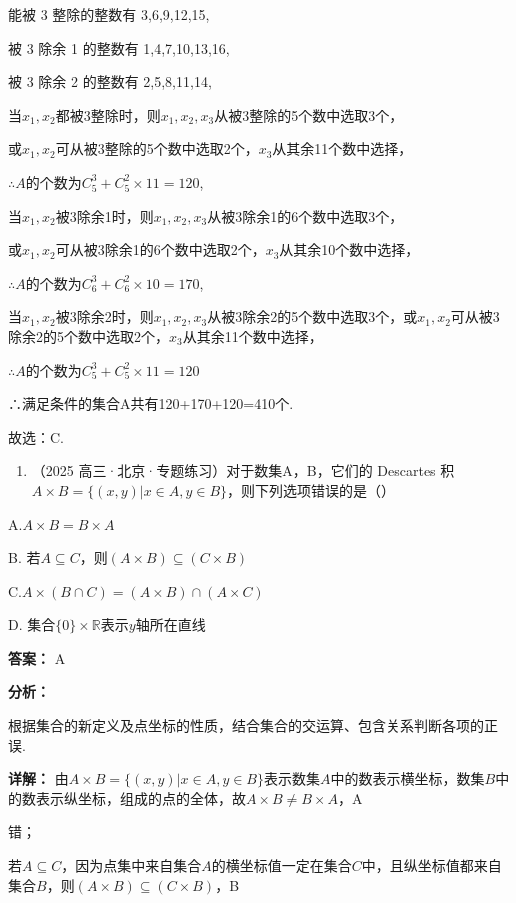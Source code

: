 \documentclass[11pt,a4paper]{ctexart}
\begin{document}
能被 3 整除的整数有 3,6,9,12,15,

被 3 除余 1 的整数有 1,4,7,10,13,16,

被 3 除余 2 的整数有 2,5,8,11,14,

当\(x_{1}, x_{2}\)都被3整除时，则\(x_{1}, x_{2}, x_{3}\)从被3整除的5个数中选取3个，

或\(x_{1}, x_{2}\)可从被3整除的5个数中选取2个，\(x_{3}\)从其余11个数中选择，

\(\therefore A\)的个数为\(C_5^3 + C_5^2 \times 11 = 120\),

当\(x_{1}, x_{2}\)被3除余1时，则\(x_{1}, x_{2}, x_{3}\)从被3除余1的6个数中选取3个，

或\(x_{1}, x_{2}\)可从被3除余1的6个数中选取2个，\(x_{3}\)从其余10个数中选择，

\(\therefore A\)的个数为\(C_6^3 + C_6^2 \times 10 = 170\),

当\(x_{1}, x_{2}\)被3除余2时，则\(x_{1}, x_{2}, x_{3}\)从被3除余2的5个数中选取3个，或\(x_{1}, x_{2}\)可从被3除余2的5个数中选取2个，\(x_{3}\)从其余11个数中选择，

\(\therefore A\)的个数为\(C_5^3+C_5^2\times11=120\)

∴满足条件的集合A共有120+170+120=410个.

故选：C.

\begin{enumerate}[label=\arabic*., leftmargin=*, start=18]
\item （2025 高三·北京·专题练习）对于数集A，B，它们的 Descartes
  积\(A \times B = \{(x, y) | x \in A, y \in B\}\)，则下列选项错误的是（）
\end{enumerate}

A.\(A \times B = B \times A\)

B. 若\(A \subseteq C\)，则\((A \times B) \subseteq (C \times B)\)

C.\(A \times (B \cap C) = (A \times B) \cap (A \times C)\)

D. 集合\(\{0\} \times \mathbb{R}\)表示\(y\)轴所在直线

\textbf{答案：}
A

\textbf{分析：}

根据集合的新定义及点坐标的性质，结合集合的交运算、包含关系判断各项的正误.

\textbf{详解：}
由\(A \times B = \{(x, y) | x \in A, y \in B\}\)表示数集\(A\)中的数表示横坐标，数集\(B\)中的数表示纵坐标，组成的点的全体，故\(A \times B \neq B \times A\)，A

错；

若\(A \subseteq C\)，因为点集中来自集合\(A\)的横坐标值一定在集合\(C\)中，且纵坐标值都来自集合\(B\)，则\((A \times B) \subseteq (C \times B)\)，B
\end{document}
